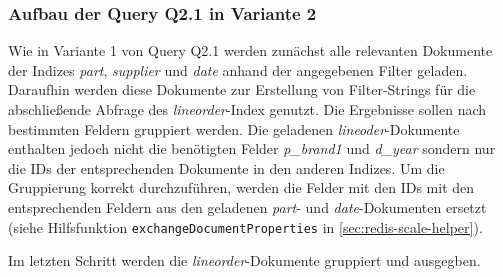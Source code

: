 \subsubsection{Aufbau der Query Q2.1 in Variante 2}
Wie in Variante 1 von Query Q2.1 werden zunächst alle relevanten Dokumente der Indizes \emph{part}, \emph{supplier} und \emph{date} anhand der angegebenen Filter geladen. 
Daraufhin werden diese Dokumente zur Erstellung von Filter-Strings für die abschließende Abfrage des \emph{lineorder}-Index genutzt.
Die Ergebnisse sollen nach bestimmten Feldern gruppiert werden. Die geladenen \emph{lineoder}-Dokumente enthalten jedoch nicht die benötigten Felder \emph{p\_brand1} und \emph{d\_year} sondern nur die IDs der entsprechenden Dokumente in den anderen Indizes. Um die Gruppierung korrekt durchzuführen, werden die Felder mit den IDs mit den entsprechenden Feldern aus den geladenen \emph{part}- und \emph{date}-Dokumenten ersetzt (siehe Hilfsfunktion \lstinline|exchangeDocumentProperties| in \cref{sec:redis-scale-helper}).

Im letzten Schritt werden die \emph{lineorder}-Dokumente gruppiert und ausgegben.


